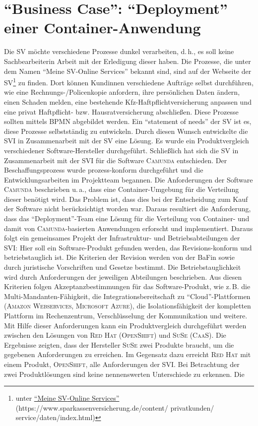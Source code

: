 \section{\enquote{Business Case}: \enquote{Deployment} einer Container-Anwendung}
Die \ac{SV} möchte verschiedene Prozesse dunkel verarbeiten, d.\,h., es soll keine Sachbearbeiterin Arbeit mit der Erledigung dieser haben. Die Prozesse, die unter dem Namen \enquote{Meine \ac{SV}-Online Services} bekannt sind, sind auf der Webseite der \ac{SV}\footnote{unter \href{https://www.sparkassenversicherung.de/content/privatkunden/service/daten/index.html}{\enquote{Meine \ac{SV}-Online Services}} (https://www.sparkassenversicherung.de/content/ privatkunden/ service/daten/index.html)} zu finden. Dort können Kundinnen verschiedene Aufträge selbst durchführen, wie eine Rechnungs-/Policenkopie anfordern, ihre persönlichen Daten ändern, einen Schaden melden, eine bestehende Kfz-Haftpflichtversicherung anpassen und eine privat Haftpflicht- bzw. Hausratversicherung abschließen. Diese Prozesse sollten mittels \ac{BPMN} abgebildet werden. Ein \enquote{statement of needs} der \ac{SV} ist es, diese Prozesse selbstständig zu entwickeln. Durch diesen Wunsch entwickelte die \ac{SVI} in Zusammenarbeit mit der \ac{SV} eine Lösung. Es wurde ein Produktvergleich verschiedener Software-Hersteller durchgeführt. Schließlich hat sich die \ac{SV} in Zusammenarbeit mit der \ac{SVI} für die Software \textsc{Camunda} entschieden. Der Beschaffungsprozess wurde prozess-konform durchgeführt und die Entwicklungsarbeiten im Projektteam begannen. Die Anforderungen der Software \textsc{Camunda} beschrieben u.\,a., dass eine Container-Umgebung für die Verteilung dieser benötigt wird. Das Problem ist, dass dies  bei der Entscheidung zum Kauf der Software nicht berücksichtigt worden war. Daraus resultiert die Anforderung, dass das \enquote{Deployment}-Team eine Lösung für die Verteilung von Container- und damit von \textsc{Camunda}-basierten Anwendungen erforscht und implementiert. Daraus folgt ein gemeinsames Projekt der Infrastruktur- und Betriebsabteilungen der \ac{SVI}: Hier soll ein Software-Produkt gefunden werden, das Revisions-konform und betriebstauglich ist. Die Kriterien der Revision werden von der \ac{BaFin} sowie durch juristische Vorschriften und Gesetze bestimmt. Die Betriebstauglichkeit wird durch Anforderungen der jeweiligen Abteilungen beschrieben. Aus diesen Kriterien folgen Akzeptanzbestimmungen für das Software-Produkt, wie z.\,B. die Multi-Mandanten-Fähigkeit, die Integrationsbereitschaft zu \enquote{Cloud}-Plattformen (\textsc{Amazon Webservices}, \textsc{Microsoft Azure}), die Isolationsfähigkeit der kompletten Plattform im Rechenzentrum, Verschlüsselung der Kommunikation und weitere. Mit Hilfe dieser Anforderungen kann ein Produktvergleich durchgeführt werden zwischen den Lösungen von \textsc{Red Hat} (\textsc{OpenShift}) und \textsc{SuSe} (\textsc{CaaS}). Die Ergebnisse zeigten, dass der Hersteller \textsc{SuSe} zwei Produkte braucht, um die gegebenen Anforderungen zu erreichen. Im Gegensatz dazu erreicht \textsc{Red Hat} mit einem Produkt, \textsc{OpenShift}, alle Anforderungen der \ac{SVI}. Bei Betrachtung der zwei Produktlösungen sind keine nennenswerten Unterschiede zu erkennen. Die 